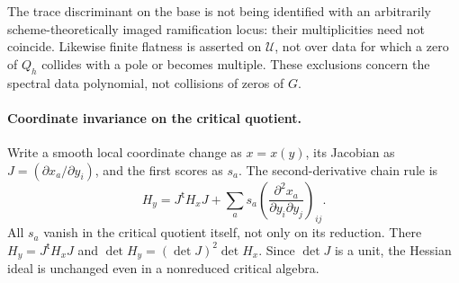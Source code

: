 The trace discriminant on the base is not being identified with an
arbitrarily scheme-theoretically imaged ramification locus: their
multiplicities need not coincide.  Likewise finite flatness is asserted
on \(\mathscr U\), not over data for which a zero of \(Q_h\)
collides with a pole or becomes multiple.  These exclusions concern
the spectral data polynomial, not collisions of zeros of \(G\).

\paragraph{Coordinate invariance on the critical quotient.}
Write a smooth local coordinate change as \(x=x(y)\), its Jacobian as
\(J=(\partial x_a/\partial y_i)\), and the first scores as \(s_a\).
The second-derivative chain rule is
\[
 H_y=J^{\mathsf t}H_xJ+
             \sum_a s_a\left(\frac{\partial^2x_a}
                                   {\partial y_i\partial y_j}\right)_{ij}.
\]
All \(s_a\) vanish in the critical quotient itself, not only on its
reduction.  There \(H_y=J^{\mathsf t}H_xJ\) and
\(\det H_y=(\det J)^2\det H_x\).  Since \(\det J\) is a unit,
the Hessian ideal is unchanged even in a nonreduced critical algebra.

